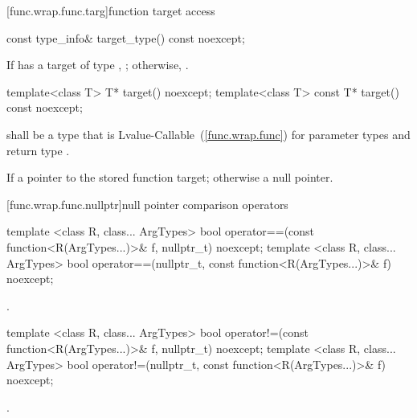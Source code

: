 [func.wrap.func.targ]{function target access}

%
\begin{itemdecl}
const type_info& target_type() const noexcept;
\end{itemdecl}

\begin{itemdescr}
\pnum\returns If  has a target of type ,
  ; otherwise, .
\end{itemdescr}

%
\begin{itemdecl}
template<class T>       T* target() noexcept;
template<class T> const T* target() const noexcept;
\end{itemdecl}

\begin{itemdescr}
\pnum
\requires {} shall be a type that is
Lvalue-Callable~(\ref{func.wrap.func}) for parameter types
and return type .

\pnum\returns If 
a pointer to the stored function target; otherwise a null pointer.
\end{itemdescr}

[func.wrap.func.nullptr]{null pointer comparison operators}

%
\begin{itemdecl}
template <class R, class... ArgTypes>
  bool operator==(const function<R(ArgTypes...)>& f, nullptr_t) noexcept;
template <class R, class... ArgTypes>
  bool operator==(nullptr_t, const function<R(ArgTypes...)>& f) noexcept;
\end{itemdecl}

\begin{itemdescr}
\pnum\returns {}.
\end{itemdescr}

%
\begin{itemdecl}
template <class R, class... ArgTypes>
  bool operator!=(const function<R(ArgTypes...)>& f, nullptr_t) noexcept;
template <class R, class... ArgTypes>
  bool operator!=(nullptr_t, const function<R(ArgTypes...)>& f) noexcept;
\end{itemdecl}

\begin{itemdescr}
\pnum\returns {}.
\end{itemdescr}

